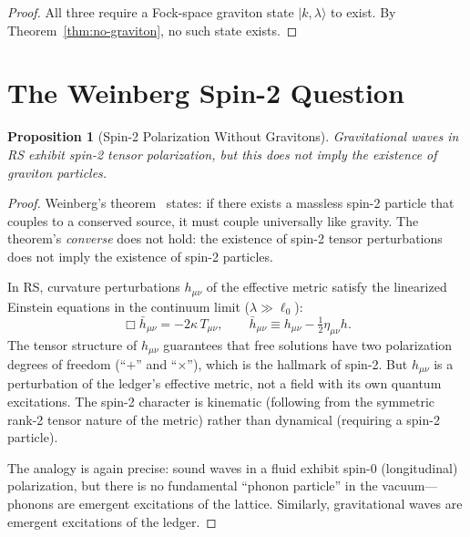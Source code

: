 \documentclass[12pt,a4paper]{article}
\newtheorem{proposition}[theorem]{Proposition}
\theoremstyle{definition}
\theoremstyle{remark}
\begin{document}
\begin{proof}
All three require a Fock-space graviton state $|k, \lambda\rangle$
to exist.  By Theorem~\ref{thm:no-graviton}, no such state exists.
\end{proof}

\section{The Weinberg Spin-2 Question}
\label{sec:weinberg}

\begin{proposition}[Spin-2 Polarization Without Gravitons]
\label{prop:spin2}
Gravitational waves in RS exhibit spin-2 tensor polarization, but
this does not imply the existence of graviton particles.
\end{proposition}

\begin{proof}
Weinberg's theorem~\cite{Weinberg1965} states: if there exists a
massless spin-2 particle that couples to a conserved source, it
must couple universally like gravity.  The theorem's
\emph{converse} does not hold: the existence of spin-2 tensor
perturbations does not imply the existence of spin-2 particles.

In RS, curvature perturbations $h_{\mu\nu}$ of the effective
metric satisfy the linearized Einstein equations in the continuum
limit ($\lambda \gg \ell_0$):
\begin{equation}
  \Box \bar{h}_{\mu\nu} = -2\kappa\, T_{\mu\nu},
  \qquad \bar{h}_{\mu\nu} \equiv h_{\mu\nu} -
  \tfrac{1}{2}\eta_{\mu\nu}h.
  \label{eq:linearized}
\end{equation}
The tensor structure of $h_{\mu\nu}$ guarantees that free
solutions have two polarization degrees of freedom (``$+$'' and
``$\times$''), which is the hallmark of spin-2.  But
$h_{\mu\nu}$ is a perturbation of the ledger's effective metric,
not a field with its own quantum excitations.  The spin-2
character is kinematic (following from the symmetric rank-2
tensor nature of the metric) rather than dynamical (requiring a
spin-2 particle).

The analogy is again precise: sound waves in a fluid exhibit
spin-0 (longitudinal) polarization, but there is no fundamental
``phonon particle'' in the vacuum---phonons are emergent
excitations of the lattice.  Similarly, gravitational waves are
emergent excitations of the ledger.
\end{proof}
\end{document}
